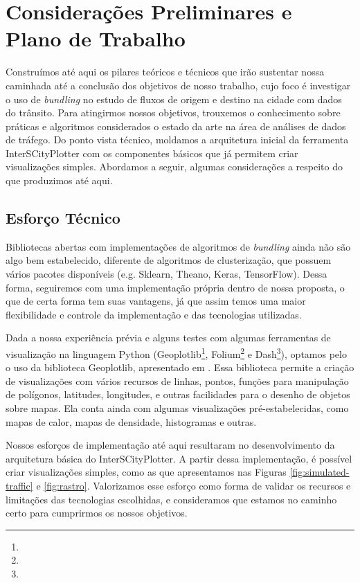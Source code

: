 \chapter{Considerações Preliminares e Plano de Trabalho}
\label{cap:plano-de-trabalho}

  Construímos até aqui os pilares teóricos e técnicos que irão sustentar nossa
caminhada até a conclusão dos objetivos de nosso trabalho, cujo foco é
investigar o uso de \emph{bundling} no estudo de fluxos de origem e destino na
cidade com dados do trânsito. Para atingirmos nossos
objetivos, trouxemos o conhecimento sobre práticas e algoritmos
considerados o estado da arte na área de análises de dados de tráfego. Do ponto
vista técnico, moldamos a arquitetura inicial da ferramenta InterSCityPlotter
com os componentes básicos que já permitem criar visualizações simples. Abordamos
a seguir, algumas considerações a respeito do que produzimos até aqui.

\section{Esforço Técnico}

  Bibliotecas abertas com implementações de algoritmos de \emph{bundling} ainda
não são algo bem estabelecido, diferente de algoritmos de clusterização, que
possuem vários pacotes disponíveis (e.g. Sklearn, Theano, Keras, TensorFlow). Dessa forma, seguiremos com uma
implementação própria dentro de nossa proposta, o que de certa forma tem suas
vantagens, já que assim temos uma maior flexibilidade e controle da implementação
e das tecnologias utilizadas. 

 Dada a nossa experiência prévia e alguns
testes com algumas ferramentas de visualização na linguagem Python
(Geoplotlib\footnote{},
Folium\footnote{} e
Dash\footnote{}), optamos pelo o uso da
biblioteca Geoplotlib, apresentado em \citet{Andrea2016}. Essa biblioteca
permite a criação de visualizações com vários recursos de linhas, pontos,
funções para manipulação de polígonos, latitudes, longitudes, e outras
facilidades para o desenho de objetos sobre mapas. Ela conta ainda com algumas
visualizações pré-estabelecidas, como mapas de calor, mapas de densidade,
histogramas e outras.

 Nossos esforços de implementação até aqui resultaram no
desenvolvimento da arquitetura básica do InterSCityPlotter. A partir dessa
implementação, é possível criar visualizações simples, como as que apresentamos
nas Figuras \ref{fig:simulated-traffic} e \ref{fig:rastro}. Valorizamos esse
esforço como forma de validar os recursos e limitações das tecnologias
escolhidas, e consideramos que estamos no caminho certo para cumprirmos os
nossos objetivos.

